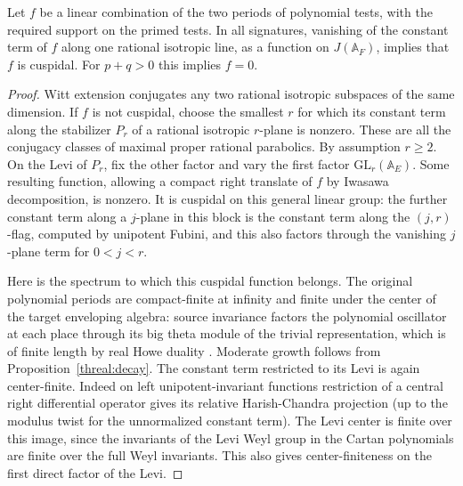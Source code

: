 \begin{proposition}\label{threal:detectline}
Let \(f\) be a linear combination of the two periods of polynomial
tests, with the required support on the primed tests. In all
signatures, vanishing of the constant term of \(f\) along one
rational isotropic line, as a function on \(J(\mathbb A_F)\),
implies that \(f\) is cuspidal. For \(p+q>0\) this implies \(f=0\).
\end{proposition}
\begin{proof}
Witt extension conjugates any two rational isotropic subspaces of the
same dimension. If \(f\) is not cuspidal, choose the smallest \(r\)
for which its constant term along the stabilizer \(P_r\) of a rational
isotropic \(r\)-plane is nonzero. These are all the conjugacy classes
of maximal proper rational parabolics. By assumption \(r\ge2\).
On the Levi of \(P_r\), fix the other factor and vary the first
factor \(\mathrm{GL}_r(\mathbb A_E)\). Some resulting function,
allowing a compact right translate of \(f\) by Iwasawa decomposition,
is nonzero. It is cuspidal on this general linear group: the further
constant term along a \(j\)-plane in this block is the constant term
along the \((j,r)\)-flag, computed by unipotent Fubini, and this
also factors through the vanishing \(j\)-plane term for \(0<j<r\).

Here is the spectrum to which this cuspidal function belongs.
The original polynomial periods are compact-finite at infinity
and finite under the center of the target enveloping algebra:
source invariance factors the polynomial oscillator at each place
through its big theta module of the trivial representation, which
is of finite length by real Howe duality \cite{howeTranscending}.
Moderate growth follows from Proposition~\ref{threal:decay}.
The constant term restricted to its Levi is again center-finite.
Indeed on left unipotent-invariant functions restriction of a
central right differential operator gives its relative
Harish-Chandra projection (up to the modulus twist for the
unnormalized constant term). The Levi center is finite over this
image, since the invariants of the Levi Weyl group in the Cartan
polynomials are finite over the full Weyl invariants. This also
gives center-finiteness on the first direct factor of the Levi.


\end{proof}
